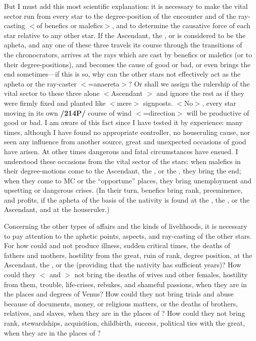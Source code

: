 But I must add this most scientific explanation: it is necessary to make the vital sector run from every star to the degree-position of the encounter and of the ray-casting $<$of benefics or malefics$>$, and to determine the causative force of each star relative to any other star. If the Ascendant, the \Sun, or \Moon\xspace is considered to be the apheta, and any one of these three travels its course through the transitions of the chronocrators, arrives at the rays which are cast by benefics or malefics (or to their degree-positions), and becomes the cause of good or bad, or even brings the end sometimes—if this is so, why can the other stars not effectively act as the apheta or the ray-caster $<$=anaereta$>$? Or shall we assign the rulership of the vital
sector to these three alone $<$Ascendant \Sun\xspace \Moon$>$ and ignore the rest as if they were firmly fixed and planted like $<$mere$>$ signposts. $<$No$>$, every star moving in its own \textbf{/214P/} course of wind $<$=direction$>$ will be productive of good or bad. I am aware of this fact since I have tested it by experience: many times, although I have found no appropriate controller, no houseruling cause, nor seen any influence from another source, great and unexpected occasions of good have arisen. At other times dangerous and fatal circumstances have ensued. I understood these occasions from the vital sector of the stars: when malefics in their degree-motions come to the Ascendant, the \Sun, or the \Moon, they bring the end; when they come to MC or the “opportune”
places, they bring unemployment and upsetting or dangerous crises. (In their turn, benefics bring rank, preeminence, and profits, if the apheta of the basis of the nativity is found at the \Sun, the \Moon, or the Ascendant, and at the houseruler.)

Concerning the other types of affairs and the kinds of livelihoods, it is necessary to pay attention to the aphetic points, aspects, and ray-casting of the other stars. For how could \Saturn\xspace and \Mars\xspace not produce illness, sudden critical times, the deaths of fathers and mothers, hostility from the great, ruin of rank, degree position, at the Ascendant, the \Sun, or the \Moon\xspace (providing that the nativity has sufficient years)? How could they $<$\Saturn\xspace and \Mars$>$ not bring the deaths of wives and other females, hostility from them, trouble, life-crises, rebukes, and shameful passions, when they are in the places and degrees of Venus? How could they not bring trials and abuse because of documents, money, or religious matters, or the deaths of brothers, relatives, and slaves, when they are in the places of \Mercury? How could they not bring rank, stewardships, acquisition, childbirth, success, political ties with the great, when they are in the places of
\Jupiter?

